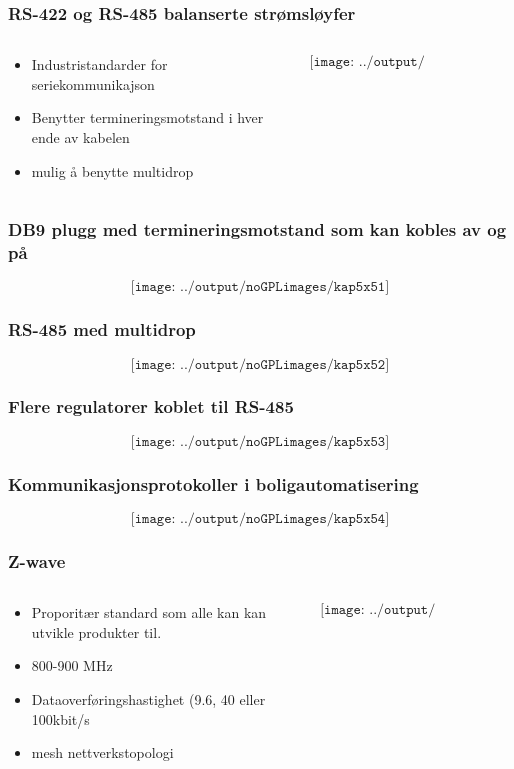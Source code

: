 \documentclass[aspectratio=169,xcolor=dvipsnames]{beamer}
\begin{document}
\begin{frame}
	\frametitle{RS-422 og RS-485 balanserte strømsløyfer}
	\begin{columns}
		\begin{column}{0.5\textwidth}

			\begin{itemize}
				\item Industristandarder for seriekommunikajson
				\item Benytter termineringsmotstand i hver ende av kabelen
				\item mulig å benytte multidrop
			\end{itemize}

			
		\end{column}

		\begin{column}{0.5\textwidth}
	$$\texttt{[image: ../output/noGPLimages/kap5x50]}$$
		\end{column}
	\end{columns}
\end{frame}
\begin{frame}
	\frametitle{DB9 plugg med termineringsmotstand som kan kobles av og på}
	$$\texttt{[image: ../output/noGPLimages/kap5x51]}$$
\end{frame}
\begin{frame}
	\frametitle{RS-485 med multidrop}
	$$\texttt{[image: ../output/noGPLimages/kap5x52]}$$
\end{frame}
\begin{frame}
	\frametitle{Flere regulatorer koblet til RS-485}
	$$\texttt{[image: ../output/noGPLimages/kap5x53]}$$
\end{frame}
\begin{frame}
	\frametitle{Kommunikasjonsprotokoller i boligautomatisering}
	$$\texttt{[image: ../output/noGPLimages/kap5x54]}$$
\end{frame}
\begin{frame}
	\frametitle{Z-wave}
	\begin{columns}
		\begin{column}{0.5\textwidth}

			\begin{itemize}
				\item Proporitær standard som alle kan kan utvikle produkter til. 
				\item 800-900 MHz
				\item Dataoverføringshastighet (9.6, 40 eller 100kbit/s
				\item mesh nettverkstopologi
			\end{itemize}

			
		\end{column}

		\begin{column}{0.5\textwidth}
	$$\texttt{[image: ../output/noGPLimages/kap5x55]}$$
		\end{column}
	\end{columns}
\end{frame}
\end{document}
